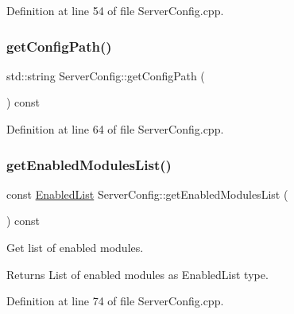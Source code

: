 Definition at line 54 of file Server\+Config.\+cpp.

\mbox{\label{class_zia_1_1_server_config_aaa1d6beade9709ef602149c669641da9}} 
\subsubsection{\texorpdfstring{get\+Config\+Path()}{getConfigPath()}}
{\footnotesize\ttfamily std\+::string Server\+Config\+::get\+Config\+Path (\begin{DoxyParamCaption}{ }\end{DoxyParamCaption}) const\hspace{0.3cm}{\ttfamily [noexcept]}}



Definition at line 64 of file Server\+Config.\+cpp.

\mbox{\label{class_zia_1_1_server_config_a3ee30a0d396ff60fc7d06110005654f3}} 
\subsubsection{\texorpdfstring{get\+Enabled\+Modules\+List()}{getEnabledModulesList()}}
{\footnotesize\ttfamily const \hyperlink{namespace_zia_a3076ef33a6c08b068cb8e444848ad33c}{Enabled\+List} Server\+Config\+::get\+Enabled\+Modules\+List (\begin{DoxyParamCaption}{ }\end{DoxyParamCaption}) const\hspace{0.3cm}{\ttfamily [noexcept]}}



Get list of enabled modules. 

\begin{DoxyReturn}{Returns}
List of enabled modules as Enabled\+List type. 
\end{DoxyReturn}


Definition at line 74 of file Server\+Config.\+cpp.

\mbox{\label{class_zia_1_1_server_config_a931a626c641223c2136979ef4c1aafe9}} 
